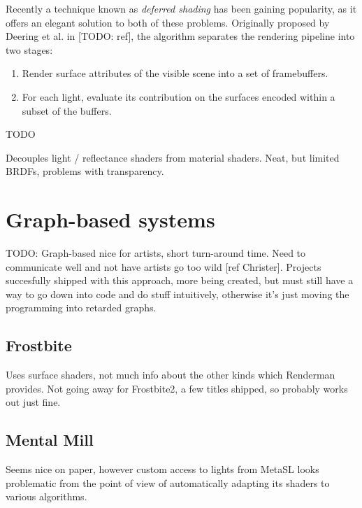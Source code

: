 Recently a technique known as \emph{deferred shading} has been gaining popularity, as it offers an elegant solution to both of these problems. Originally proposed by Deering et al. in [TODO: ref], the algorithm separates the rendering pipeline into two stages:

\begin{enumerate}
\item Render surface attributes of the visible scene into a set of framebuffers.
\item For each light, evaluate its contribution on the surfaces encoded within a subset of the buffers.
\end{enumerate}


TODO

Decouples light / reflectance shaders from material shaders. Neat, but limited BRDFs, problems with transparency.


\section{Graph-based systems}

TODO: Graph-based nice for artists, short turn-around time. Need to communicate well and not have artists go too wild [ref Christer]. Projects succesfully shipped with this approach, more being created, but must still have a way to go down into code and do stuff intuitively, otherwise it's just moving the programming into retarded graphs.

\subsection{Frostbite}

Uses surface shaders, not much info about the other kinds which Renderman provides. Not going away for Frostbite2, a few titles shipped, so probably works out just fine.

\subsection{Mental Mill}

Seems nice on paper, however custom access to lights from MetaSL looks problematic from the point of view of automatically adapting its shaders to various algorithms.

